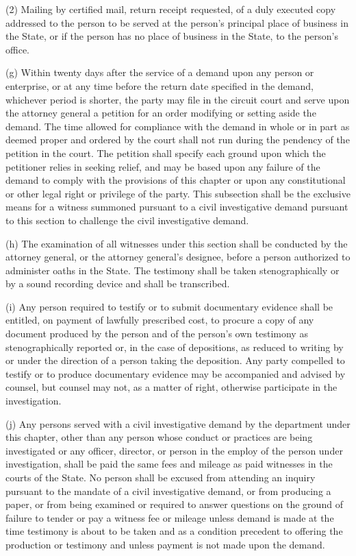     (2)  Mailing by certified mail, return receipt requested, of a duly executed copy addressed to the person to be served at the person's principal place of business in the State, or if the person has no place of business in the State, to the person's office.

     (g)  Within twenty days after the service of a demand upon any person or enterprise, or at any time before the return date specified in the demand, whichever period is shorter, the party may file in the circuit court and serve upon the attorney general a petition for an order modifying or setting aside the demand.  The time allowed for compliance with the demand in whole or in part as deemed proper and ordered by the court shall not run during the pendency of the petition in the court.  The petition shall specify each ground upon which the petitioner relies in seeking relief, and may be based upon any failure of the demand to comply with the provisions of this chapter or upon any constitutional or other legal right or privilege of the party.  This subsection shall be the exclusive means for a witness summoned pursuant to a civil investigative demand pursuant to this section to challenge the civil investigative demand.

      (h)  The examination of all witnesses under this section shall be conducted by the attorney general, or the attorney general's designee, before a person authorized to administer oaths in the State.  The testimony shall be taken stenographically or by a sound recording device and shall be transcribed.

     (i)  Any person required to testify or to submit documentary evidence shall be entitled, on payment of lawfully prescribed cost, to procure a copy of any document produced by the person and of the person's own testimony as stenographically reported or, in the case of depositions, as reduced to writing by or under the direction of a person taking the deposition.  Any party compelled to testify or to produce documentary evidence may be accompanied and advised by counsel, but counsel may not, as a matter of right, otherwise participate in the investigation.

     (j)  Any persons served with a civil investigative demand by the department under this chapter, other than any person whose conduct or practices are being investigated or any officer, director, or person in the employ of the person under investigation, shall be paid the same fees and mileage as paid witnesses in the courts of the State.  No person shall be excused from attending an inquiry pursuant to the mandate of a civil investigative demand, or from producing a paper, or from being examined or required to answer questions on the ground of failure to tender or pay a witness fee or mileage unless demand is made at the time testimony is about to be taken and as a condition precedent to offering the production or testimony and unless payment is not made upon the demand.

